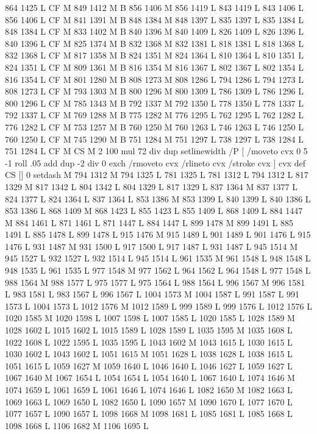 {{{{{{{{{{{{{{{{{{{{{{{{864 1425 L
CF M
849 1412 M B
856 1406 M 856 1419 L
843 1419 L
843 1406 L
856 1406 L
CF M
841 1391 M B
848 1384 M 848 1397 L
835 1397 L
835 1384 L
848 1384 L
CF M
833 1402 M B
840 1396 M 840 1409 L
826 1409 L
826 1396 L
840 1396 L
CF M
825 1374 M B
832 1368 M 832 1381 L
818 1381 L
818 1368 L
832 1368 L
CF M
817 1358 M B
824 1351 M 824 1364 L
810 1364 L
810 1351 L
824 1351 L
CF M
809 1361 M B
816 1354 M 816 1367 L
802 1367 L
802 1354 L
816 1354 L
CF M
801 1280 M B
808 1273 M 808 1286 L
794 1286 L
794 1273 L
808 1273 L
CF M
793 1303 M B
800 1296 M 800 1309 L
786 1309 L
786 1296 L
800 1296 L
CF M
785 1343 M B
792 1337 M 792 1350 L
778 1350 L
778 1337 L
792 1337 L
CF M
769 1288 M B
775 1282 M 776 1295 L
762 1295 L
762 1282 L
776 1282 L
CF M
753 1257 M B
760 1250 M 760 1263 L
746 1263 L
746 1250 L
760 1250 L
CF M
745 1290 M B
751 1284 M 751 1297 L
738 1297 L
738 1284 L
751 1284 L
CF M
CS M 2 100 mul 72 div dup setlinewidth
/P [ /moveto cvx 0 5 -1 roll .05 add dup -2 div 0 exch /rmoveto cvx /rlineto cvx /stroke cvx ] cvx def
CS [] 0 setdash M
794 1312 M 794 1325 L
781 1325 L
781 1312 L
794 1312 L
817 1329 M 817 1342 L
804 1342 L
804 1329 L
817 1329 L
837 1364 M 837 1377 L
824 1377 L
824 1364 L
837 1364 L
853 1386 M 853 1399 L
840 1399 L
840 1386 L
853 1386 L
868 1409 M 868 1423 L
855 1423 L
855 1409 L
868 1409 L
884 1447 M 884 1461 L
871 1461 L
871 1447 L
884 1447 L
899 1478 M 899 1491 L
885 1491 L
885 1478 L
899 1478 L
915 1476 M 915 1489 L
901 1489 L
901 1476 L
915 1476 L
931 1487 M 931 1500 L
917 1500 L
917 1487 L
931 1487 L
945 1514 M 945 1527 L
932 1527 L
932 1514 L
945 1514 L
961 1535 M 961 1548 L
948 1548 L
948 1535 L
961 1535 L
977 1548 M 977 1562 L
964 1562 L
964 1548 L
977 1548 L
988 1564 M 988 1577 L
975 1577 L
975 1564 L
988 1564 L
996 1567 M 996 1581 L
983 1581 L
983 1567 L
996 1567 L
1004 1573 M 1004 1587 L
991 1587 L
991 1573 L
1004 1573 L
1012 1576 M 1012 1589 L
999 1589 L
999 1576 L
1012 1576 L
1020 1585 M 1020 1598 L
1007 1598 L
1007 1585 L
1020 1585 L
1028 1589 M 1028 1602 L
1015 1602 L
1015 1589 L
1028 1589 L
1035 1595 M 1035 1608 L
1022 1608 L
1022 1595 L
1035 1595 L
1043 1602 M 1043 1615 L
1030 1615 L
1030 1602 L
1043 1602 L
1051 1615 M 1051 1628 L
1038 1628 L
1038 1615 L
1051 1615 L
1059 1627 M 1059 1640 L
1046 1640 L
1046 1627 L
1059 1627 L
1067 1640 M 1067 1654 L
1054 1654 L
1054 1640 L
1067 1640 L
1074 1646 M 1074 1659 L
1061 1659 L
1061 1646 L
1074 1646 L
1082 1650 M 1082 1663 L
1069 1663 L
1069 1650 L
1082 1650 L
1090 1657 M 1090 1670 L
1077 1670 L
1077 1657 L
1090 1657 L
1098 1668 M 1098 1681 L
1085 1681 L
1085 1668 L
1098 1668 L
1106 1682 M 1106 1695 L
}}}}}}}}}}}}}}}}}}}}}}}}
